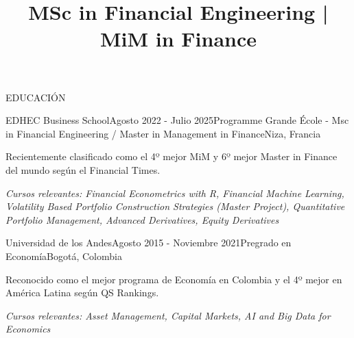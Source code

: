 \documentclass{resume} %
\title{MSc in Financial Engineering | MiM in Finance} %
\begin{document}
%
%

\begin{rSection}{EDUCACIÓN}

\begin{rSubsection}{EDHEC Business School}{Agosto 2022 - Julio 2025}{Programme Grande École - Msc in Financial Engineering / Master in Management in Finance}{Niza, Francia}
    \item Recientemente clasificado como el 4º mejor MiM y 6º mejor Master in Finance del mundo según el Financial Times.
    \item \textit{Cursos relevantes: Financial Econometrics with R, Financial Machine Learning, Volatility Based Portfolio Construction Strategies (Master Project), Quantitative Portfolio Management, Advanced Derivatives, Equity Derivatives}
\end{rSubsection}

\begin{rSubsection}{Universidad de los Andes}{Agosto 2015 - Noviembre 2021}{Pregrado en Economía}{Bogotá, Colombia}
    \item Reconocido como el mejor programa de Economía en Colombia y el 4º mejor en América Latina según QS Rankings.
    \item \textit{Cursos relevantes: Asset Management, Capital Markets, AI and Big Data for Economics}
\end{rSubsection}

\end{rSection}

\vspace{0.5em}

%
%
\end{document}

